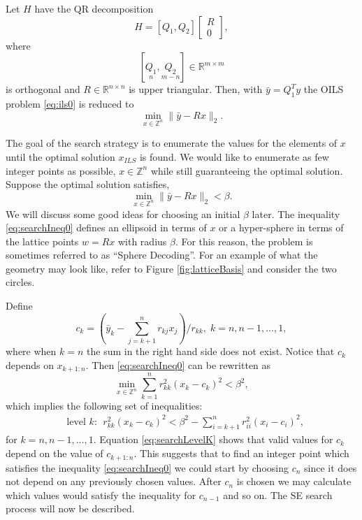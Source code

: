 \documentclass[12pt,Bold,letterpaper]{mcgilletdclass}
\newcommand{\bmx}{\begin{bmatrix}}
\newcommand{\emx}{\end{bmatrix}}
\newcommand{\be}{\begin{equation}}
\newcommand{\ee}{\end{equation}}
\newcommand{\by}{{\bar{y}}}
\begin{document}
Let $H$ have the QR decomposition
$$
H=[Q_1, Q_2] \bmx R \\ 0 \emx,
$$
where $$[\underset{n}{Q_1}, \underset{m-n}{Q_2}]  \in \mathbb{R}^{m\times m}$$ is orthogonal
and $R\in \mathbb{R}^{n\times n}$ is upper triangular. 
Then, with $\bar{y}=Q_1^Ty$ the OILS problem \eqref{eq:ils0} is reduced to 
\be 
\label{eq:ils}
\min_{x \in  {\mathbb{Z}^n}}  \| \by- Rx \|_2.
\ee

The goal of the search strategy is to enumerate the values for the elements of $x$ until the optimal solution $x_{\scriptscriptstyle{ILS}}$ is found. We would like to enumerate as few integer points as possible, $x \in \mathbb{Z}^n$ while still guaranteeing the optimal solution. Suppose the optimal solution satisfies,
\be 
\label{eq:searchIneq0}
\min_{x \in  {\mathbb{Z}^n}}  \| \by- Rx \|_2 < \beta. 
\ee
We will discuss some good ideas for choosing an initial $\beta$ later. The inequality \eqref{eq:searchIneq0} defines an ellipsoid in terms of $x$ or a hyper-sphere in terms of the lattice points $w=Rx$ with radius $\beta$. For this reason, the problem is sometimes referred to as ``Sphere Decoding''. For an example of what the geometry may look like, refer to Figure \ref{fig:latticeBasis} and consider the two circles.

Define
\begin{equation}
 c_k = (\bar{y}_k - \sum_{j=k+1}^nr_{kj}x_j)/r_{kk}, \; k=n, n-1,\ldots, 1,
\label{eq:searchC}
\end{equation}
where when $k=n$ the sum in the right hand side does not exist. Notice that $c_k$ depends on $x_{k+1:n}$.
Then \eqref{eq:searchIneq0} can be rewritten as
\begin{equation}\label{eq:searchIneq1}
\min_{x \in  {\mathbb{Z}^n}} \sum_{k=1}^n r_{kk}^2(x_k-c_k)^2 < \beta^2,
\end{equation}
which implies the following
set of inequalities:
\begin{align}
&\text{level } k: \ \ r_{kk}^2(x_k-c_k)^2 < \beta^2 -\sum_{i=k+1}^nr_{ii}^2(x_i-c_i)^2, \label{eq:searchLevelK}
\end{align}
for $k=n,n-1,\ldots, 1$. Equation \eqref{eq:searchLevelK} shows that valid values for $c_k$ depend on the value of $c_{k+1:n}$. This suggests that to find an integer point which satisfies the inequality \ref{eq:searchIneq0} we could start by choosing $c_n$ since it does not depend on any previously chosen values. After $c_n$ is chosen we may calculate which values would satisfy the inequality for $c_{n-1}$ and so on. The SE search process will now be described.
\end{document}
